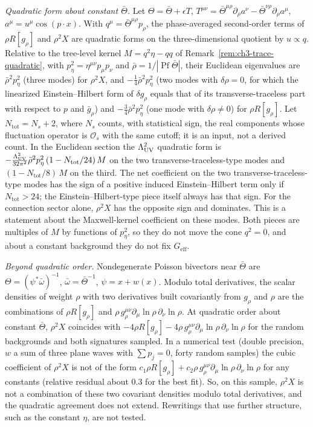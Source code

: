 \emph{Quadratic form about constant \(\bar\Theta\).} Let
\(\Theta=\bar\Theta+\epsilon T\), \(T^{\mu\nu}
=\bar\Theta^{\mu\rho}\partial_\rho a^\nu-\bar\Theta^{\nu\rho}\partial_\rho a^\mu\),
\(a^\mu=u^\mu\cos(p\cdot x)\). With \(q^\mu=\bar\Theta^{\mu\rho}p_\rho\),
the phase-averaged second-order terms of \(\rho R[g_\rho]\) and
\(\rho^2X\) are quadratic forms on the three-dimensional quotient by
\(u\propto q\). Relative to the tree-level kernel
\(M=q^2\eta-qq\) of Remark~\ref{rem:ch3-trace-quadratic}, with
\(p_\eta^2=\eta^{\mu\nu}p_\mu p_\nu\) and
\(\bar\rho=1/|\operatorname{Pf}\bar\Theta|\), their Euclidean
eigenvalues are
\(\bar\rho^{2}p_\eta^2\) (three modes) for \(\rho^2X\), and
\(-\tfrac14\bar\rho^{2}p_\eta^2\) (two modes with \(\delta\rho=0\), for
which the linearized Einstein--Hilbert form of \(\delta g_\rho\) equals
that of its transverse-traceless part with respect to \(p\) and
\(\bar g_\rho\)) and \(-\tfrac34\bar\rho^{2}p_\eta^2\) (one mode with
\(\delta\rho\ne0\)) for \(\rho R[g_\rho]\). Let
\(N_{\mathrm{tot}}=N_s+2\), where \(N_s\) counts, with statistical
sign, the real components whose fluctuation operator is
\(\mathcal O_s\) with the same cutoff; it is an input, not a derived
count. In the Euclidean section the \(\Lambda_{\mathrm{UV}}^2\) quadratic form is
\(-\tfrac{\Lambda_{\mathrm{UV}}^2}{32\pi^2}\bar\rho^{2}p_\eta^2\,
(1-N_{\mathrm{tot}}/24)\,M\) on the two transverse-traceless-type
modes and \((1-N_{\mathrm{tot}}/8)\,M\) on the third. The net
coefficient on the two transverse-traceless-type modes has the sign of
a positive induced Einstein--Hilbert term only if
\(N_{\mathrm{tot}}>24\); the Einstein--Hilbert-type piece itself always
has that sign. For the connection sector alone, \(\rho^2X\) has the
opposite sign and dominates. This is a statement about the
Maxwell-kernel coefficient on these modes. Both pieces are multiples of
\(M\) by functions of \(p_\eta^2\), so they do not move the cone
\(q^2=0\), and about a constant background they do not fix
\(G_{\mathrm{eff}}\).

\emph{Beyond quadratic order.} Nondegenerate Poisson bivectors near
\(\bar\Theta\) are \(\Theta=(\psi^*\bar\omega)^{-1}\),
\(\bar\omega=\bar\Theta^{-1}\), \(\psi=x+w(x)\). Modulo total
derivatives, the scalar densities of weight \(\rho\) with two
derivatives built covariantly from \(g_\rho\) and \(\rho\) are the
combinations of \(\rho R[g_\rho]\) and
\(\rho\,g_\rho^{\mu\nu}\partial_\mu\ln\rho\,\partial_\nu\ln\rho\). At
quadratic order about constant \(\bar\Theta\), \(\rho^2X\) coincides
with \(-4\rho R[g_\rho]-4\rho\,g_\rho^{\mu\nu}\partial_\mu\ln\rho\,
\partial_\nu\ln\rho\) for the random backgrounds and both signatures
sampled. In a numerical test (double precision, \(w\) a sum of three
plane waves with \(\sum p_j=0\), forty random samples) the cubic
coefficient of \(\rho^2X\) is not of the form
\(c_1\rho R[g_\rho]+c_2\rho\,g_\rho^{\mu\nu}\partial_\mu\ln\rho\,
\partial_\nu\ln\rho\) for any constants (relative residual about
\(0.3\) for the best fit). So, on this sample, \(\rho^2X\) is not a
combination of these two covariant densities modulo total derivatives,
and the quadratic agreement does not extend. Rewritings that use
further structure, such as the constant \(\eta\), are not tested.

